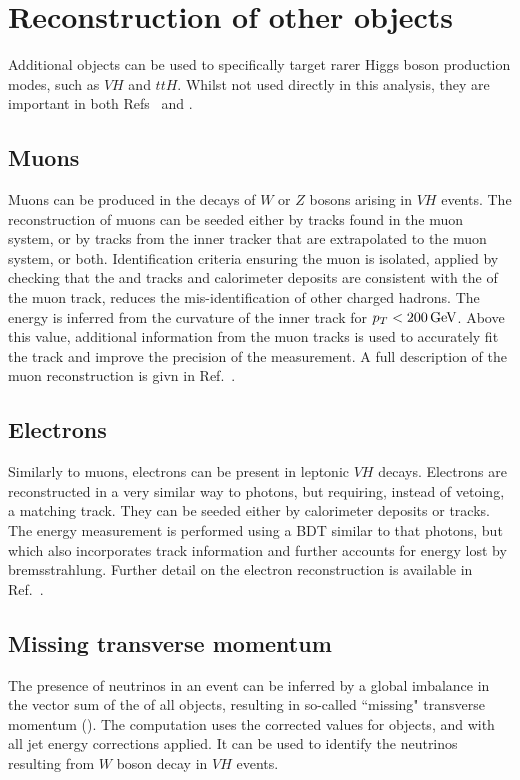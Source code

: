 \section{Reconstruction of other objects}

Additional objects can be used to specifically target rarer Higgs boson production modes, such as $VH$ and $ttH$.
Whilst not used directly in this analysis, they are important in both Refs~\cite{HIG-16-040} and \cite{HIG-18-018}.

\subsection{Muons}

Muons can be produced in the decays of $W$ or $Z$ bosons arising in $VH$ events.
The reconstruction of muons can be seeded either by tracks found in the muon system, 
or by tracks from the inner tracker that are extrapolated to the muon system, or both.
Identification criteria ensuring the muon is isolated, 
applied by checking that the \pt and tracks and calorimeter deposits are consistent with the \pt of the muon track, 
reduces the mis-identification of other charged hadrons.
The energy is inferred from the curvature of the inner track for $p_T < \SI{200}{GeV}$.
Above this value, additional information from the muon tracks is used to accurately fit the track
and improve the precision of the \pt measurement.
A full description of the muon reconstruction is givn in Ref.~\cite{MuonReco}.


\subsection{Electrons}

Similarly to muons, electrons can be present in leptonic $VH$ decays.
Electrons are reconstructed in a very similar way to photons, 
but requiring, instead of vetoing, a matching track.
They can be seeded either by calorimeter deposits or tracks.
The energy measurement is performed using a BDT similar to that photons, 
but which also incorporates track information and further accounts for energy lost by bremsstrahlung.
Further detail on the electron reconstruction is available in Ref.~\cite{ElectronReco}.

\subsection{Missing transverse momentum}

The presence of neutrinos in an event can be inferred by a global imbalance in the vector sum of the \pt of all objects, 
resulting in so-called ``missing" transverse momentum (\met).
The \met computation uses the corrected \pt values for objects, and with all jet energy corrections applied.
It can be used to identify the neutrinos resulting from $W$ boson decay in $VH$ events.
